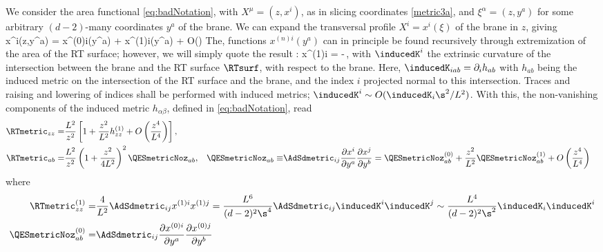 We consider the area functional \eqref{eq:badNotation}, with $X^\mu=(z,x^i)$, as in slicing coordinates \eqref{metric3a}, and $\xi^\alpha=(z,y^a)$ for some arbitrary $(d-2)$-many coordinates $y^a$ of the brane. We can expand the transversal profile $X^i=x^i(\xi)$ of the brane in $z$, giving
\beq\label{run11}
x^i(z,y^a) = x^{(0)i}(y^a) + x^{(1)i}(y^a) + O\left(\right)
\eeq
The, functions $x^{(n)i}(y^a)$ can in principle be found recursively through extremization of the area of the RT surface; however, we will simply quote the result \cite{Hung_2011}:
\beq
x^{(1)i} = -\,,
\eeq
with $\inducedK^i$ the extrinsic curvature of the intersection between the brane and the RT surface $\RTsurf$, with respect to the brane. Here, $\inducedK_{iab} = \partial_i h_{ab}$ with $h_{ab}$ being the induced metric on the intersection of the RT surface and the brane, and the index $i$ projected normal to this intersection. Traces and raising and lowering of indices shall be performed with induced metrics; \eg $\inducedK^i \sim O(\inducedK_i \s^2/L^2)$.  With this, the non-vanishing components of the induced metric $h_{\alpha\beta}$, defined in \eqref{eq:badNotation}, read
\begin{align}
\RTmetric_{zz}
=& \frac{L^2}{z^2}\left[
1 + \frac{z^2}{L^2} h_{zz}^{(1)} + O\left(\frac{z^4}{L^4}\right)
\right],
\label{eq:bacardi}\\
\RTmetric_{ab}
=& \frac{L^2}{z^2}\left(1+\frac{z^2}{4L^2}\right)^2 \QESmetricNoz_{ab},
&
\QESmetricNoz_{ab}
\equiv& \AdSdmetric_{ij}
\frac{\partial x^i}{\partial y^a}
\frac{\partial x^j}{\partial y^b}
= \QESmetricNoz_{ab}^{(0)}
+ \frac{z^2}{L^2} \QESmetricNoz_{ab}^{(1)}
+ O\left(\frac{z^4}{L^4}\right)
\label{eq:jackDaniels}
\end{align}
where
\begin{align}
  \RTmetric_{zz}^{(1)}=& \frac{4}{L^2} \AdSdmetric_{ij} x^{(1)i} x^{(1)j}
  = \frac{L^6}{(d-2)^2 \s^4} \AdSdmetric_{ij} \inducedK^i \inducedK^j
  \sim \frac{L^4}{(d-2)^2 \s^2} \inducedK_i \inducedK^i
  \label{eq:zirkova}
  \\
  \QESmetricNoz_{ab}^{(0)}
  =& \AdSdmetric_{ij}
  \frac{\partial x^{(0)i}}{\partial y^a}
  \frac{\partial x^{(0)j}}{\partial y^b}
\end{align}
